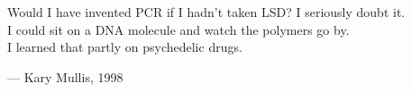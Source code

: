 \begin{flushright}
\begin{hangleftquote}{\QENOpen}{\QENClose}
Would I have invented PCR if I hadn't taken LSD? I seriously doubt it.\\
I could sit on a DNA molecule and watch the polymers go by.\\
I learned that partly on psychedelic drugs.
\end{hangleftquote}
\par\smallskip
\normalfont — Kary Mullis, 1998
\end{flushright}
